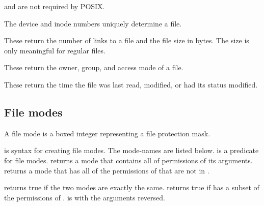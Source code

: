 \noindent
{} and  are not required by POSIX.

\begin{protos}
\end{protos}
\noindent
The device and inode numbers uniquely determine a file.

\begin{protos}
\end{protos}
\noindent
These return the number of links to a file and the file size in bytes.
The size is only meaningful for regular files.

\begin{protos}
\end{protos}
\noindent
These return the owner, group, and access mode of a file.

\begin{protos}
\end{protos}
\noindent
These return the time the file was last read, modified, or had its
 status modified.

\subsection{File modes}

A file mode is a boxed integer representing a file protection mask.

\begin{protos}
\end{protos}
\noindent
{} is syntax for creating file modes.
The mode-names are listed below.
 is a predicate for file modes.
 returns a mode that contains all of permissions of
 its arguments.
 returns a mode that has all of the permissions of
  that are not in .

\begin{protos}
\end{protos}
\noindent
{} returns true if the two modes are exactly the same.
 returns true if  has a subset
 of the permissions of .
 is  with the arguments reversed.

